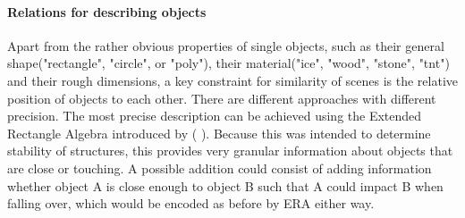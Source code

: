 \paragraph{Relations for describing objects}
Apart from the rather obvious properties of single objects, such as their general shape("rectangle", "circle", or "poly"), their material("ice", "wood", "stone", "tnt") and their rough dimensions, a key constraint for similarity of scenes is the relative position of objects to each other.
There are different approaches with different precision.
The most precise description can be achieved using the Extended Rectangle Algebra introduced by (%
). Because this was intended to determine stability of structures, this provides very granular information about objects that are close or touching.
A possible addition could consist of adding information whether object A is close enough to object B such that A could impact B when falling over, which would be encoded as before by ERA either way.


